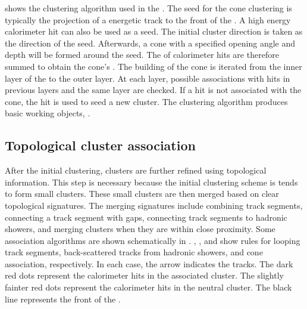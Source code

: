  shows the clustering algorithm used in the \pandora. The seed for the cone clustering is typically the projection of a energetic track to the front of the \ECAL. A high  energy calorimeter hit can also be used as a seed. The initial cluster direction is taken as the direction of the seed. Afterwards, a cone with a specified opening angle and depth will be formed around the seed. The \fourMomentum of calorimeter hits are therefore summed to obtain the cone's \fourMomentum. The building of the cone is iterated from the inner layer of the \ECAL to the outer layer. At each layer, possible associations with hits in previous layers and the same layer are checked. If a hit is not associated with the cone, the hit is used to seed a new cluster. The clustering algorithm produces basic working objects, \clusters.

\subsection{Topological cluster association}

After the initial clustering, clusters are further refined using topological information. This step is necessary because the initial clustering scheme is tends to form small clusters. These small clusters are then merged  based on clear topological signatures. The merging signatures include combining track segments, connecting a track segment with gaps, connecting track segments to  hadronic showers, and merging clusters when they are within close proximity. Some association algorithms are shown schematically in .  , , and  show rules for looping track segments, back-scattered tracks from hadronic showers, and cone association, respectively. In each case, the arrow indicates the tracks. The dark red dots represent the calorimeter hits in the associated cluster. The slightly fainter red dots represent the calorimeter hits in the neutral cluster. The black line represents the front of the \ECAL.

